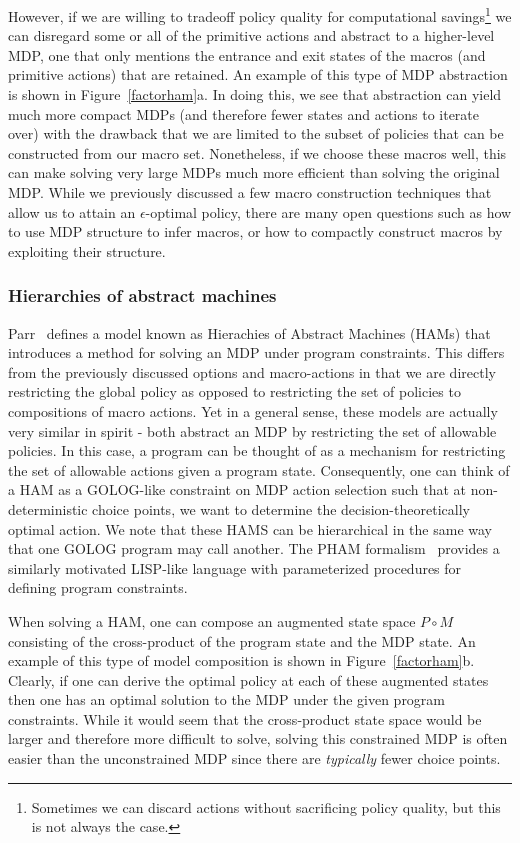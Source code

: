 However, if we are willing to tradeoff policy quality for
computational savings\footnote{Sometimes we can discard actions
without sacrificing policy quality, but this is not always the case.}
we can disregard some or all of the primitive actions and abstract to a
higher-level MDP, one that only mentions the entrance and exit states
of the macros (and primitive actions) that are retained.  An example
of this type of MDP abstraction is shown in Figure~\ref{factorham}a.
In doing this, we see that abstraction can yield much more compact
MDPs (and therefore fewer states and actions to iterate over) with the
drawback that we are limited to the subset of policies that can be
constructed from our macro set.  Nonetheless, if we choose these
macros well, this can make solving very large MDPs much more efficient
than solving the original MDP.  While we previously discussed a few macro 
construction techniques that allow us to attain an $\epsilon$-optimal policy,
there are many open questions such
as how to use MDP structure to infer macros, or how to compactly construct
macros by exploiting their structure.

\subsubsection{Hierarchies of abstract machines}

Parr~\cite{parr-russell:nips97} defines a model known as Hierachies of
Abstract Machines (HAMs) that introduces a method for solving an MDP
under program constraints.  This differs from the previously discussed
options and macro-actions in that we are directly restricting the
global policy as opposed to restricting the set of policies to
compositions of macro actions.  Yet in a general sense, these
models are actually very similar in spirit - both abstract an MDP by
restricting the set of allowable policies.  In this case, a program
can be thought of as a mechanism for restricting the set of allowable
actions given a program state.  Consequently, one can think of a HAM
as a GOLOG-like constraint on MDP action selection such that at
non-deterministic choice points, we want to determine the
decision-theoretically optimal action.  We note that these HAMS can be
hierarchical in the same way that one GOLOG program may call another.  
The PHAM formalism~\cite{pham1} provides a similarly motivated
LISP-like language 
with parameterized procedures for defining program constraints.

When solving a HAM, one can compose an augmented state space 
$P \circ M$ consisting of the cross-product of the program state and the MDP
state.  An example of this type of model composition is shown in
Figure~\ref{factorham}b.  Clearly, if one can derive the optimal
policy at each of these augmented states then one has an optimal
solution to the MDP under the given program constraints.  While it
would seem that the cross-product state space would be larger and
therefore more difficult to solve, solving this constrained MDP is
often easier than the unconstrained MDP since there are \emph{typically}
fewer choice points.

